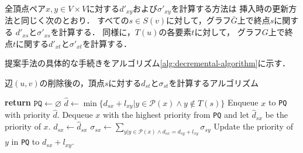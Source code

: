 全頂点ペア$x,y\in V\times V$に対する$d'_{xy}$および$\sigma'_{xy}$を計算する方法は
挿入時の更新方法と同じく次のとおり．
すべての$s\in S(v)$に対して，グラフ$\bar{G}$上で終点$s$に関する
$d'_{xs}$と$\sigma'_{xs}$を計算する．
同様に，$T(u)$の各要素$t$に対して，
グラフ$G$上で終点$t$に関する$d'_{xt}$と$\sigma'_{xt}$を計算する．

提案手法の具体的な手続きをアルゴリズム\ref{alg:decremental-algorithm}に示す．

\begin{algorithm}[tb]
  \caption{辺$(u,v)$の削除後の，頂点$s$に対する$d_{st}$と$\sigma_{st}$を計算するアルゴリズム}
  \label{alg:decremental-algorithm}
  \begin{algorithmic}[1]\small
    \State \textbf{return}
    \EndIf
    \State $\texttt{PQ}\gets\varnothing$
    \State $\hat{d}\gets\min\{d_{sx}+l_{xy}|y\in\mathcal{P}(x)\land y\notin T(s)\}$
    \State Enqueue $x$ to \texttt{PQ} with priority $\hat{d}$.
    \EndIf
    \EndFor
    \State Dequeue $x$ with the highest priority from \texttt{PQ}
    \State and let $\hat{d}_{sx}$ be the priority of $x$.
    \State $d_{sx}\gets\hat{d}_{sx}$
    \State $\sigma_{sx}\gets\sum_{y|y\in\mathcal{P}(x)\land d_{sx}=d_{sy}+l_{xy}}\sigma_{sy}$
    \State Update the priority of $y$ in \texttt{PQ} to $d_{sx}+l_{xy}$.
    \EndIf
    \EndFor
    \EndWhile
    \EndProcedure
  \end{algorithmic}
\end{algorithm}
